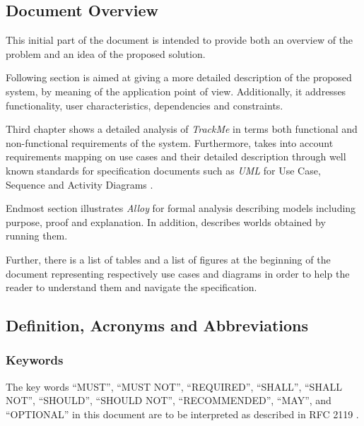 \documentclass[a4paper]{article}
\begin{document}
    \subsection{Document Overview}
        This initial part of the document is intended to provide both an overview of the problem and an idea of the proposed solution.
        
        Following section is aimed at giving a more detailed description of the proposed system, by meaning of the application point of view. Additionally, it addresses functionality, user characteristics, dependencies and constraints.
        
        Third chapter shows a detailed analysis of \textit{TrackMe} in terms both functional and non-functional requirements of the system. Furthermore, takes into account requirements mapping on use cases and their detailed description through well known standards for specification documents such as \textit{UML} for Use Case, Sequence and Activity Diagrams \cite{rumbaugh2004unified}.
        
        Endmost section illustrates \textit{Alloy} for formal analysis \cite{jackson2006software} describing models including purpose, proof and explanation. In addition, describes worlds obtained by running them.
        
        Further, there is a list of tables and a list of figures at the beginning of the document representing respectively use cases and diagrams in order to help the reader to understand them and navigate the specification.
        
    \subsection{Definition, Acronyms and  Abbreviations}
            \subsubsection{Keywords}
            The key words “MUST”, “MUST NOT”, “REQUIRED”, “SHALL”, “SHALL NOT”, “SHOULD”, “SHOULD NOT”, “RECOMMENDED”, “MAY”, and “OPTIONAL” in this document are to be interpreted as described in RFC 2119 \cite{bradner1997key}.
\end{document}
